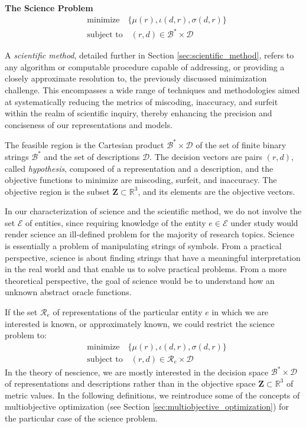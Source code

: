 \begin{tBox}
\textbf{The Science Problem}
\begin{align*}
 & \text{minimize} \quad \{ \mu(r), \iota(d, r), \sigma(d, r)\} \\
 & \text{subject to} \quad (r, d) \in \mathcal{B}^\ast \times \mathcal{D}
\end{align*}
\end{tBox}

A \emph{scientific method}, detailed further in Section \ref{sec:scientific_method}, refers to any algorithm or computable procedure capable of addressing, or providing a closely approximate resolution to, the previously discussed minimization challenge. This encompasses a wide range of techniques and methodologies aimed at systematically reducing the metrics of miscoding, inaccuracy, and surfeit within the realm of scientific inquiry, thereby enhancing the precision and conciseness of our representations and models.

The feasible region is the Cartesian product $\mathcal{B}^\ast \times \mathcal{D}$ of the set of finite binary strings $\mathcal{B}^\ast$ and the set of descriptions $\mathcal{D}$. The decision vectors are pairs $(r, d)$, called \emph{hypothesis}, composed of a representation and a description, and the objective functions to minimize are miscoding, surfeit, and inaccuracy. The objective region is the subset $\mathbf{Z} \subset \mathbb{R}^3$, and its elements are the objective vectors.

In our characterization of science and the scientific method, we do not involve the set $\mathcal{E}$ of entities, since requiring knowledge of the entity $e \in \mathcal{E}$ under study would render science an ill-defined problem for the majority of research topics. Science is essentially a problem of manipulating strings of symbols. From a practical perspective, science is about finding strings that have a meaningful interpretation in the real world and that enable us to solve practical problems. From a more theoretical perspective, the goal of science would be to understand how an unknown abstract oracle functions.

If the set $\mathcal{R}_e$ of representations of the particular entity $e$ in which we are interested is known, or approximately known, we could restrict the science problem to:
\begin{align*}
 & \text{minimize} \quad \{ \mu(r), \iota(d, r), \sigma(d, r)\} \\
 & \text{subject to} \quad (r, d) \in \mathcal{R}_e \times \mathcal{D}
\end{align*}
In the theory of nescience, we are mostly interested in the decision space $\mathcal{B}^\ast \times \mathcal{D}$ of representations and descriptions rather than in the objective space $\mathbf{Z} \subset \mathbb{R}^3$ of metric values. In the following definitions, we reintroduce some of the concepts of multiobjective optimization (see Section \ref{sec:multiobjective_optimization}) for the particular case of the science problem.

